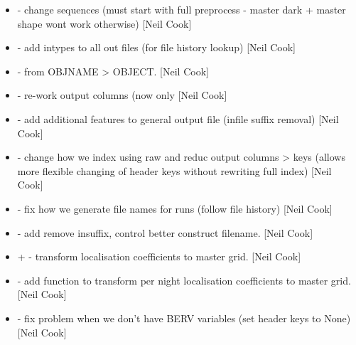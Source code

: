 \documentclass[a4paper,10pt,english]{report}
\begin{document}
\begin{itemize}
\item {} 
 - change sequences (must
start with full preprocess - master dark + master shape wont work
otherwise) {[}Neil Cook{]}

\item {} 
 - add intypes to all out
files (for file history lookup) {[}Neil Cook{]}

\item {} 
 -  from OBJNAME
\textendash{}\textgreater{} OBJECT. {[}Neil Cook{]}

\item {} 
 - re-work output columns (now
only  {[}Neil Cook{]}

\item {} 
 - add additional features to general
output file (infile suffix removal) {[}Neil Cook{]}

\item {} 
 - change how we index using raw and reduc
output columns \textendash{}\textgreater{} keys (allows more flexible changing of header keys
without rewriting full index) {[}Neil Cook{]}

\item {} 
 - fix how we generate file names for runs
(follow file history) {[}Neil Cook{]}

\item {} 
 - add remove insuffix, control better construct
filename. {[}Neil Cook{]}

\item {} 
 +  - transform
localisation coefficients to master grid. {[}Neil Cook{]}

\item {} 
 - add  function to transform
per night localisation coefficients to master grid. {[}Neil Cook{]}

\item {} 
 - fix problem when we don’t have BERV
variables (set header keys to None) {[}Neil Cook{]}


\end{itemize}
\end{document}
